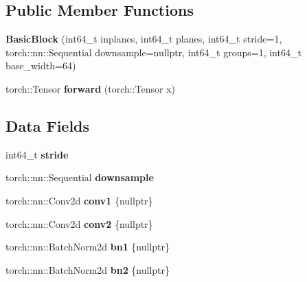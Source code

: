 \subsection*{Public Member Functions}
\begin{DoxyCompactItemize}
\item 
\mbox{\label{structvision_1_1models_1_1__resnetimpl_1_1BasicBlock_ab7b6ea8f328046286a9d57421c4351a9}} 
{\bfseries Basic\+Block} (int64\+\_\+t inplanes, int64\+\_\+t planes, int64\+\_\+t stride=1, torch\+::nn\+::\+Sequential downsample=nullptr, int64\+\_\+t groups=1, int64\+\_\+t base\+\_\+width=64)
\item 
\mbox{\label{structvision_1_1models_1_1__resnetimpl_1_1BasicBlock_a59cb97675123a82bae2e9e837401c5a4}} 
torch\+::\+Tensor {\bfseries forward} (torch\+::\+Tensor x)
\end{DoxyCompactItemize}
\subsection*{Data Fields}
\begin{DoxyCompactItemize}
\item 
\mbox{\label{structvision_1_1models_1_1__resnetimpl_1_1BasicBlock_ac509762f431c11d17eceeacfbec74206}} 
int64\+\_\+t {\bfseries stride}
\item 
\mbox{\label{structvision_1_1models_1_1__resnetimpl_1_1BasicBlock_ad55164fd51eebe4bcb780aba5435f6e4}} 
torch\+::nn\+::\+Sequential {\bfseries downsample}
\item 
\mbox{\label{structvision_1_1models_1_1__resnetimpl_1_1BasicBlock_a66658f06b50efd9456f897a905461097}} 
torch\+::nn\+::\+Conv2d {\bfseries conv1} \{nullptr\}
\item 
\mbox{\label{structvision_1_1models_1_1__resnetimpl_1_1BasicBlock_a82b1096c8c891bdfce41f06edb66e210}} 
torch\+::nn\+::\+Conv2d {\bfseries conv2} \{nullptr\}
\item 
\mbox{\label{structvision_1_1models_1_1__resnetimpl_1_1BasicBlock_ad6b514f723aa7d1bd769fd4955ad9e2d}} 
torch\+::nn\+::\+Batch\+Norm2d {\bfseries bn1} \{nullptr\}
\item 
\mbox{\label{structvision_1_1models_1_1__resnetimpl_1_1BasicBlock_a2c1ed5219ef603198a4096f7a6311f76}} 
torch\+::nn\+::\+Batch\+Norm2d {\bfseries bn2} \{nullptr\}
\end{DoxyCompactItemize}
